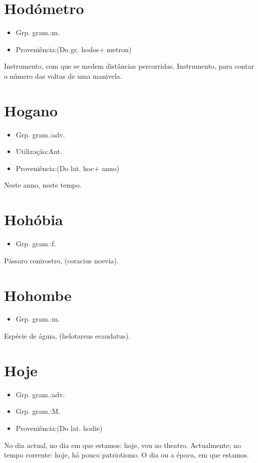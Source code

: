 \documentclass{article}
\begin{document}
\section{Hodómetro}
\begin{itemize}
\item {Grp. gram.:m.}
\end{itemize}
\begin{itemize}
\item {Proveniência:(Do gr. \textunderscore hodos\textunderscore  + \textunderscore metron\textunderscore )}
\end{itemize}
Instrumento, com que se medem distâncias percorridas.
Instrumento, para contar o número das voltas de uma manivela.
\section{Hogano}
\begin{itemize}
\item {Grp. gram.:adv.}
\end{itemize}
\begin{itemize}
\item {Utilização:Ant.}
\end{itemize}
\begin{itemize}
\item {Proveniência:(Do lat. \textunderscore hoc\textunderscore  + \textunderscore anno\textunderscore )}
\end{itemize}
Neste anno, neste tempo.
\section{Hohóbia}
\begin{itemize}
\item {Grp. gram.:f.}
\end{itemize}
Pássaro conirostro, (\textunderscore coracius noevia\textunderscore ).
\section{Hohombe}
\begin{itemize}
\item {Grp. gram.:m.}
\end{itemize}
Espécie de águia, (\textunderscore helotarsus ecaudatus\textunderscore ).
\section{Hoje}
\begin{itemize}
\item {Grp. gram.:adv.}
\end{itemize}
\begin{itemize}
\item {Grp. gram.:M.}
\end{itemize}
\begin{itemize}
\item {Proveniência:(Do lat. \textunderscore hodie\textunderscore )}
\end{itemize}
No dia actual, no dia em que estamos: \textunderscore hoje, vou ao theatro\textunderscore .
Actualmente; no tempo corrente: \textunderscore hoje, há pouco patriotismo\textunderscore .
O dia ou a época, em que estamos.
\end{document}
